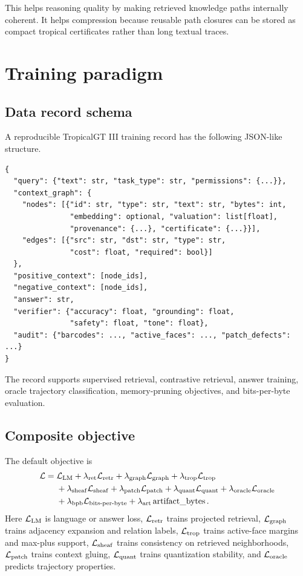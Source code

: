 \documentclass[11pt]{article}
\theoremstyle{definition}
\theoremstyle{remark}
\newcommand{\bits}{\ensuremath{\operatorname{bits\text{-}per\text{-}byte}}}
\begin{document}
This helps reasoning quality by making retrieved knowledge paths internally coherent. It helps compression because reusable path closures can be stored as compact tropical certificates rather than long textual traces.

\section{Training paradigm}

\subsection{Data record schema}

A reproducible TropicalGT III training record has the following JSON-like structure.

\begin{Verbatim}[fontsize=\small,frame=single]
{
  "query": {"text": str, "task_type": str, "permissions": {...}},
  "context_graph": {
    "nodes": [{"id": str, "type": str, "text": str, "bytes": int,
               "embedding": optional, "valuation": list[float],
               "provenance": {...}, "certificate": {...}}],
    "edges": [{"src": str, "dst": str, "type": str,
               "cost": float, "required": bool}]
  },
  "positive_context": [node_ids],
  "negative_context": [node_ids],
  "answer": str,
  "verifier": {"accuracy": float, "grounding": float,
               "safety": float, "tone": float},
  "audit": {"barcodes": ..., "active_faces": ..., "patch_defects": ...}
}
\end{Verbatim}

The record supports supervised retrieval, contrastive retrieval, answer training, oracle trajectory classification, memory-pruning objectives, and bits-per-byte evaluation.

\subsection{Composite objective}

The default objective is
\[
\begin{aligned}
\mathcal L ={}& \mathcal L_{\rm LM}+\lambda_{\rm ret}\mathcal L_{\rm retr}+\lambda_{\rm graph}\mathcal L_{\rm graph}+\lambda_{\rm trop}\mathcal L_{\rm trop}\nonumber\\
&+\lambda_{\rm sheaf}\mathcal L_{\rm sheaf}+\lambda_{\rm patch}\mathcal L_{\rm patch}+\lambda_{\rm quant}\mathcal L_{\rm quant}+\lambda_{\rm oracle}\mathcal L_{\rm oracle}\nonumber\\
&+\lambda_{\rm bpb}\mathcal L_{\bits}+\lambda_{\rm art}\operatorname{artifact\_bytes}.
\end{aligned}
\]
Here \(\mathcal L_{\rm LM}\) is language or answer loss, \(\mathcal L_{\rm retr}\) trains projected retrieval, \(\mathcal L_{\rm graph}\) trains adjacency expansion and relation labels, \(\mathcal L_{\rm trop}\) trains active-face margins and max-plus support, \(\mathcal L_{\rm sheaf}\) trains consistency on retrieved neighborhoods, \(\mathcal L_{\rm patch}\) trains context gluing, \(\mathcal L_{\rm quant}\) trains quantization stability, and \(\mathcal L_{\rm oracle}\) predicts trajectory properties.
\end{document}
